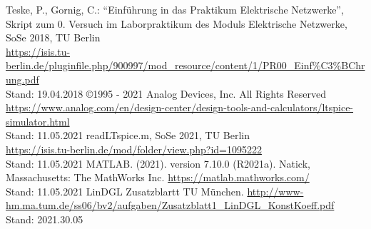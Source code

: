 %
\begin{sloppy}
\begin{small}
\begin{onehalfspacing}
  \begin{thebibliography}{--------------------} %
    Teske, P., Gornig, C.: "`Einführung in das Praktikum Elektrische Netzwerke"', Skript zum 0. Versuch im Laborpraktikum des Moduls Elektrische Netzwerke, SoSe 2018, TU Berlin\\
    \url{https://isis.tu-berlin.de/pluginfile.php/900997/mod_resource/content/1/PR00_Einf\%C3\%BChrung.pdf}\\
    Stand: 19.04.2018
    \copyright 1995 - 2021 Analog Devices, Inc. All Rights Reserved\\
    \url{https://www.analog.com/en/design-center/design-tools-and-calculators/ltspice-simulator.html}\\
    Stand: 11.05.2021
    readLTspice.m, SoSe 2021, TU Berlin\\
    \url{https://isis.tu-berlin.de/mod/folder/view.php?id=1095222}\\
    Stand: 11.05.2021
    MATLAB. (2021). version 7.10.0 (R2021a). Natick, Massachusetts: The MathWorks Inc.
    \url{https://matlab.mathworks.com/}\\
    Stand: 11.05.2021
    LinDGL Zusatzblartt TU München.
    \url{http://www-hm.ma.tum.de/ss06/bv2/aufgaben/Zusatzblatt1_LinDGL_KonstKoeff.pdf} \\
    Stand: 2021.30.05
%
%
  \end{thebibliography}
\end{onehalfspacing}
\end{small}
\end{sloppy}
